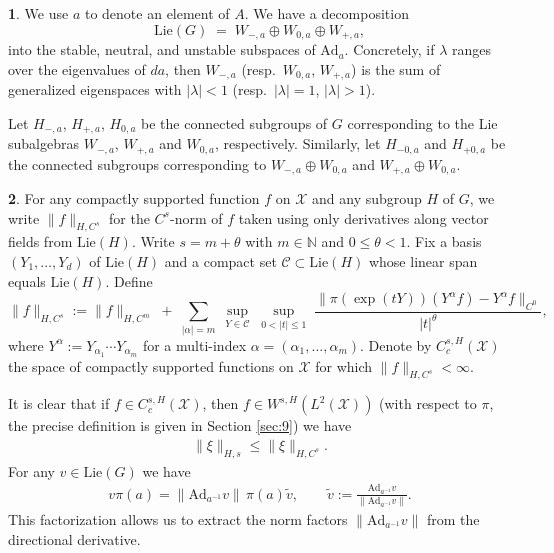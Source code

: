 \documentclass[11 pt]{amsart}
\newcommand{\NN}{\mathbb{N}}
\newcommand{\norm}[1]{\lVert#1\rVert}
\theoremstyle{definition}
\newtheorem{cect6}{}
\numberwithin{equation}{section}
\def\Lie{\mathrm{Lie}}
\begin{document}
\begin{cect6}\label{for:123} We use $a$ to denote an element of $A$.  We have a decomposition
\[
    \text{Lie}(G)\;=\; W_{-,a}\oplus W_{0,a}\oplus W_{+,a},
\]
into the stable, neutral, and unstable subspaces of $\text{Ad}_a$. Concretely, if $\lambda$ ranges over the eigenvalues of $da$, then
$W_{-,a}$ (resp.\ $W_{0,a}$, $W_{+,a}$) is the sum of generalized eigenspaces with $|\lambda|<1$ (resp.\ $|\lambda|=1$, $|\lambda|>1$).

Let $H_{-,a}$, $H_{+,a}$, $H_{0,a}$ be the connected subgroups of $G$ corresponding to the Lie subalgebras $W_{-,a}$, $W_{+,a}$ and $W_{0,a}$, respectively. Similarly, let $H_{-0,a}$ and $H_{+0,a}$ be the connected subgroups corresponding to $W_{-,a} \oplus W_{0,a}$ and $W_{+,a} \oplus W_{0,a}$.





\end{cect6}

\begin{cect6} For any compactly supported function  $f$ on $\mathcal{X}$ and any subgroup $H$ of $G$,
we write $\|f\|_{H,C^s}$ for the $C^s$-norm of $f$ taken using only
derivatives along vector fields from $\Lie(H)$. Write $s=m+\theta$ with $m\in\NN$ and $0\le\theta<1$. Fix a basis
$(Y_1,\dots,Y_d)$ of $\Lie(H)$ and a compact set $\mathcal C\subset\Lie(H)$
whose linear span equals $\Lie(H)$. Define
\[
\|f\|_{H,C^{s}}
:=\|f\|_{H,C^{m}}
\;+\;
\sum_{|\alpha|=m}\;
\sup_{Y\in\mathcal C}\;
\sup_{0<|t|\le 1}\;
\frac{\big\|\pi(\exp(tY))(Y^\alpha f) - Y^\alpha f\big\|_{C^0}}{|t|^{\theta}},
\]
where $Y^\alpha:=Y_{\alpha_1}\cdots Y_{\alpha_m}$ for a multi-index $\alpha = (\alpha_1, \dots, \alpha_m)$. Denote by $C_c^{s, H}(\mathcal{X})$ the space of compactly supported functions on $\mathcal{X}$ for which $\|f\|_{H,C^{s}} < \infty$.

 It is clear that if $f\in C_c^{s,H}(\mathcal{X})$, then $f\in W^{s,H}(L^2(\mathcal{X}))$ (with respect to $\pi$, the precise definition is given in Section \ref{sec:9}) we have
\begin{align}\label{for:189}
 \norm{\xi}_{H,s}\leq \norm{\xi}_{H,C^s}.
\end{align}
For any $v\in \text{Lie}(G)$ we have
\begin{align}\label{for:125}
v\pi(a)
=\|\text{Ad}_{a^{-1}}v\|\,\pi(a)\tilde v,
\qquad
\tilde v:=\frac{\text{Ad}_{a^{-1}}v}{\|\text{Ad}_{a^{-1}}v\|}.
\end{align}
This factorization allows us to extract the norm factors $\|\text{Ad}_{a^{-1}}v\|$ from the directional derivative.
\end{cect6}
\end{document}
